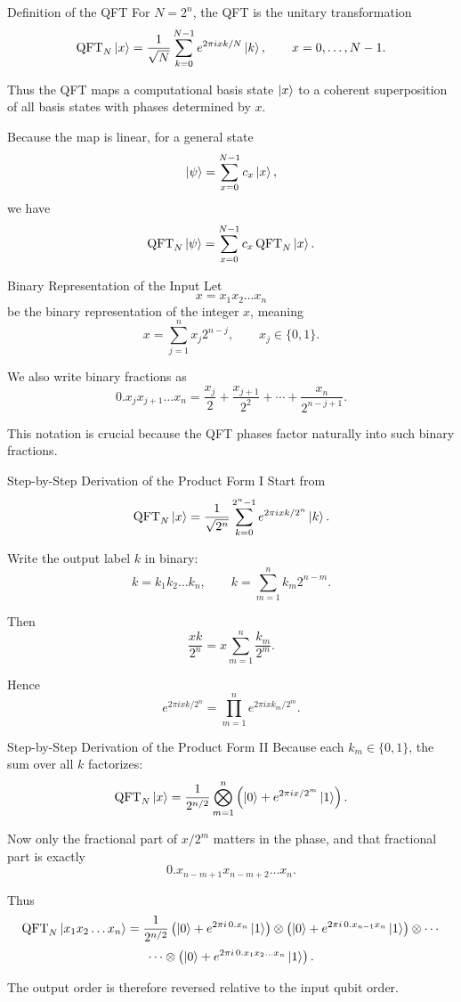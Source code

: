 \documentclass{beamer}
\begin{document}
\begin{frame}{Definition of the QFT}
For \(N=2^n\), the QFT is the unitary transformation
\[
\operatorname{QFT}_N \ket{x}
=
\frac{1}{\sqrt N}
\sum_{k=0}^{N-1}
e^{2\pi i xk/N}\ket{k},
\qquad x=0,\dots,N-1.
\]

Thus the QFT maps a computational basis state \(\ket{x}\) to a coherent superposition of all basis states with phases determined by \(x\).

Because the map is linear, for a general state
\[
\ket{\psi}=\sum_{x=0}^{N-1} c_x \ket{x},
\]
we have
\[
\operatorname{QFT}_N \ket{\psi}
=
\sum_{x=0}^{N-1} c_x \operatorname{QFT}_N\ket{x}.
\]
\end{frame}

\begin{frame}{Binary Representation of the Input}
Let
\[
x = x_1 x_2 \dots x_n
\]
be the binary representation of the integer \(x\), meaning
\[
x = \sum_{j=1}^n x_j 2^{n-j},
\qquad x_j\in\{0,1\}.
\]

We also write binary fractions as
\[
0.x_j x_{j+1}\dots x_n
=
\frac{x_j}{2}+\frac{x_{j+1}}{2^2}+\cdots+\frac{x_n}{2^{n-j+1}}.
\]

This notation is crucial because the QFT phases factor naturally into such binary fractions.
\end{frame}

\begin{frame}{Step-by-Step Derivation of the Product Form I}
Start from
\[
\operatorname{QFT}_N \ket{x}
=
\frac{1}{\sqrt{2^n}}
\sum_{k=0}^{2^n-1}
e^{2\pi i xk/2^n}\ket{k}.
\]

Write the output label \(k\) in binary:
\[
k = k_1 k_2 \dots k_n,
\qquad
k = \sum_{m=1}^n k_m 2^{n-m}.
\]

Then
\[
\frac{xk}{2^n}
=
x \sum_{m=1}^n \frac{k_m}{2^m}.
\]

Hence
\[
e^{2\pi i xk/2^n}
=
\prod_{m=1}^n e^{2\pi i x k_m / 2^m}.
\]
\end{frame}

\begin{frame}{Step-by-Step Derivation of the Product Form II}
Because each \(k_m\in\{0,1\}\), the sum over all \(k\) factorizes:
\[
\operatorname{QFT}_N \ket{x}
=
\frac{1}{2^{n/2}}
\bigotimes_{m=1}^n
\left(
\ket{0} + e^{2\pi i x/2^m}\ket{1}
\right).
\]

Now only the fractional part of \(x/2^m\) matters in the phase, and that fractional part is exactly
\[
0.x_{n-m+1}x_{n-m+2}\dots x_n.
\]

Thus
\[
\operatorname{QFT}_N \ket{x_1 x_2 \dots x_n}
=
\frac{1}{2^{n/2}}
\left(\ket{0}+e^{2\pi i\,0.x_n}\ket{1}\right)
\otimes
\left(\ket{0}+e^{2\pi i\,0.x_{n-1}x_n}\ket{1}\right)
\otimes \cdots
\]
\[
\cdots \otimes
\left(\ket{0}+e^{2\pi i\,0.x_1x_2\dots x_n}\ket{1}\right).
\]

The output order is therefore reversed relative to the input qubit order.
\end{frame}
\end{document}
